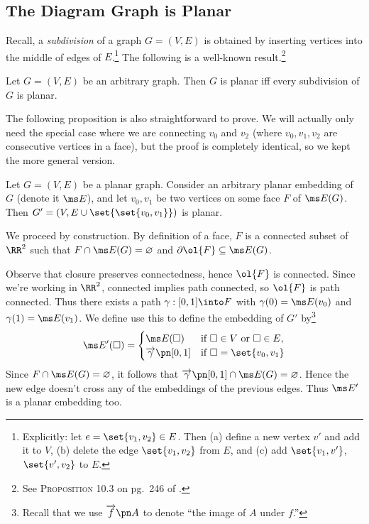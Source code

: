 \subsection{The Diagram Graph is Planar}
Recall, a \emph{subdivision} of a graph $G = (V, E)$ is obtained by
inserting vertices into the middle of edges of
$E$.\footnote{Explicitly: let $e = \set{v_1, v_2} \in E$. Then (a)
  define a new vertex $v'$ and add it to $V$, (b) delete the edge
  $\set{v_1, v_2}$ from $E$, and (c) add $\set{v_1, v'}$, $\set{v',
    v_2}$ to $E$.} The following is a well-known result.\footnote{See
  {\scshape Proposition 10.3} on pg.\ 246 of \cite{Bondy2008}.}
\begin{proposition}\label{prop:subdivision-planarity}
  Let $G = (V,E)$ be an arbitrary graph. Then $G$ is planar iff every
  subdivision of $G$ is planar.
\end{proposition}
The following proposition is also straightforward to prove. We will
actually only need the special case where we are connecting $v_0$ and
$v_2$ (where $v_0, v_1, v_2$ are consecutive vertices in a face), but
the proof is completely identical, so we kept the more general
version.
\begin{proposition}\label{prop:adding-edges-in-face}
  Let $G = (V, E)$ be a planar graph. Consider an arbitrary planar
  embedding of $G$ (denote it $\ms E$), and let $v_0, v_1$ be two
  vertices on some face $F$ of $\ms E(G)$. Then $G' = (V, E \cup
  \set{\set{v_0, v_1}})$ is planar.
\end{proposition}
\begin{sproof}[Sketch]
  We proceed by construction. By definition of a face, $F$ is a
  connected subset of $\RR^2$ such that $F \cap \ms E(G) =
  \varnothing$ and $\partial \ol{F} \subseteq \ms E(G)$.

  Observe that closure preserves connectedness, hence $\ol{F}$ is
  connected. Since we're working in $\RR^2$, connected implies path
  connected, so $\ol{F}$ is path connected. Thus there exists a path
  $\gamma : [0,1] \into F$ with $\gamma(0) = \ms E(v_0)$ and
  $\gamma(1) = \ms E(v_1)$. We define use this to define the embedding
  of $G'$ by\footnote{Recall that we use $\fim{f}{A}$ to denote ``the
    image of $A$ under $f$.''}
  \[
    \ms E'(\square) =
    \begin{cases}
      \ms E(\square) & \text{if } \square \in V \text{ or } \square \in E, \\
      \fim{\gamma}{[0,1]} &\text{if } \square = \set{v_0, v_1}
    \end{cases}
  \]
  Since $F \cap \ms E(G) = \varnothing$, it follows that
  $\fim{\gamma}{[0,1]} \cap \ms E(G) = \varnothing$. Hence the new
  edge doesn't cross any of the embeddings of the previous edges. Thus
  $\ms E'$ is a planar embedding too.
\end{sproof}

